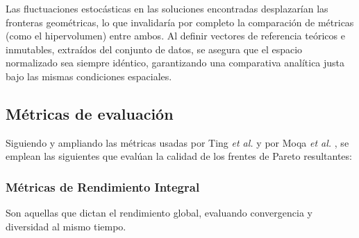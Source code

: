 Las fluctuaciones estocásticas en las soluciones encontradas desplazarían las fronteras geométricas, lo que invalidaría por completo la comparación de métricas (como el hipervolumen) entre ambos. Al definir vectores de referencia teóricos e inmutables, extraídos del conjunto de datos, se asegura que el espacio normalizado sea siempre idéntico, garantizando una comparativa analítica justa bajo las mismas condiciones espaciales.

\subsection{Métricas de evaluación}

Siguiendo y ampliando las métricas usadas por Ting \textit{et al.} \cite{ting2010multi} y por Moqa \textit{et al.} \cite{moqa2022assessing}, se emplean las siguientes que evalúan la calidad de los frentes de Pareto resultantes:

\subsubsection{Métricas de Rendimiento Integral}

Son aquellas que dictan el rendimiento global, evaluando convergencia y diversidad al mismo tiempo.

